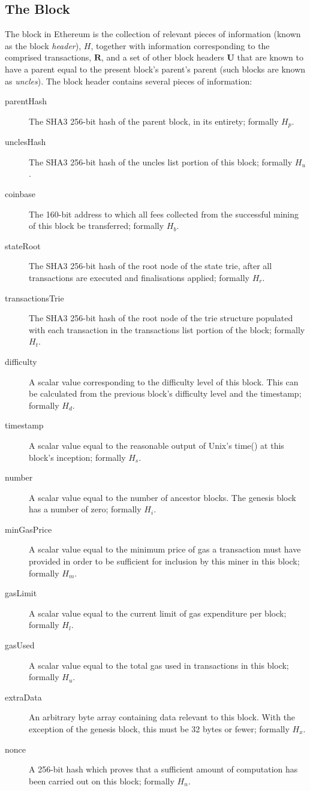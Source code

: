 \documentclass[9pt,oneside]{amsart}
\begin{document}
\begin{multicols}{2}
\subsection{The Block} \label{ch:block}

The block in Ethereum is the collection of relevant pieces of information (known as the block \textit{header}), $H$, together with information corresponding to the comprised transactions, $\mathbf{R}$, and a set of other block headers $\mathbf{U}$ that are known to have a parent equal to the present block's parent's parent (such blocks are known as \textit{uncles}). The block header contains several pieces of information:

\begin{description}
\item[parentHash] The SHA3 256-bit hash of the parent block, in its entirety; formally $H_p$.
\item[unclesHash] The SHA3 256-bit hash of the uncles list portion of this block; formally $H_u$.
\item[coinbase] The 160-bit address to which all fees collected from the successful mining of this block be transferred; formally $H_b$.
\item[stateRoot] The SHA3 256-bit hash of the root node of the state trie, after all transactions are executed and finalisations applied; formally $H_r$.
\item[transactionsTrie] The SHA3 256-bit hash of the root node of the trie structure populated with each transaction in the transactions list portion of the block; formally $H_t$.
\item[difficulty] A scalar value corresponding to the difficulty level of this block. This can be calculated from the previous block's difficulty level and the timestamp; formally $H_d$.
\item[timestamp] A scalar value equal to the reasonable output of Unix's time() at this block's inception; formally $H_s$.
\item[number] A scalar value equal to the number of ancestor blocks. The genesis block has a number of zero; formally $H_i$.
\item[minGasPrice] A scalar value equal to the minimum price of gas a transaction must have provided in order to be sufficient for inclusion by this miner in this block; formally $H_m$.
\item[gasLimit] A scalar value equal to the current limit of gas expenditure per block; formally $H_l$.
\item[gasUsed] A scalar value equal to the total gas used in transactions in this block; formally $H_u$.
\item[extraData] An arbitrary byte array containing data relevant to this block. With the exception of the genesis block, this must be 32 bytes or fewer; formally $H_x$.
\item[nonce] A 256-bit hash which proves that a sufficient amount of computation has been carried out on this block; formally $H_n$.
\end{description}


\end{multicols}
\end{document}
